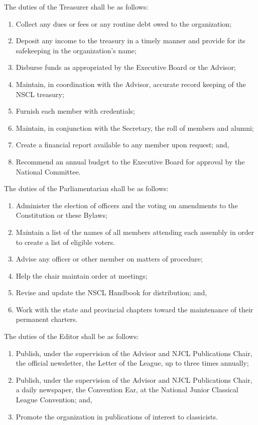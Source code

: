 \documentclass{bylaws_nofont}
\newcommand{\NSCL}{\textsc{NSCL}\xspace}
\newcommand{\NJCL}{\textsc{NJCL}\xspace}
\begin{document}
\begin{linenumbers}[1]
\begin{enumerate}
    \sub[Treasurer] The duties of the Treasurer shall be as follows:
    \begin{enumerate}
    \item Collect any dues or fees or any routine debt owed to the
      organization;
    \item Deposit any income to the treasury in a timely manner and
      provide for its safekeeping in the organization's name;
    \item Disburse funds as appropriated by the Executive Board or the
      Advisor;
    \item Maintain, in coordination with the Advisor, accurate record
      keeping of the \NSCL treasury;
    \item Furnish each member with credentials;
    \item Maintain, in conjunction with the Secretary, the roll of
      members and alumni;
    \item Create a financial report available to any member upon
      request; and,
    \item Recommend an annual budget to the Executive Board for approval
      by the National Committee.
    \end{enumerate}
    \pagebreak
    \sub[Parliamentarian] The duties of the Parliamentarian shall be as
    follows:
    \begin{enumerate}
    \item Administer the election of officers and the voting on
      amendments to the Constitution or these Bylaws;
    \item Maintain a list of the names of all members attending each
      assembly in order to create a list of eligible voters.
    \item Advise any officer or other member on matters of procedure;
    \item Help the chair maintain order at meetings;
    \item Revise and update the \NSCL Handbook for distribution; and,
    \item Work with the state and provincial chapters toward the
      maintenance of their permanent charters.
    \end{enumerate}
    
    \sub[Editor] The duties of the Editor shall be as follows:
    \begin{enumerate}
    \item Publish, under the supervision of the Advisor and \NJCL
      Publications Chair, the official newsletter, the Letter of the
      League, up to three times annually;
    \item Publish, under the supervision of the Advisor and \NJCL
      Publications Chair, a daily newspaper, the Convention Ear, at the
      National Junior Classical League Convention; and,
    \item Promote the organization in publications of interest to
      classicists.
    \end{enumerate}
    

\end{enumerate}
\end{linenumbers}
\end{document}
